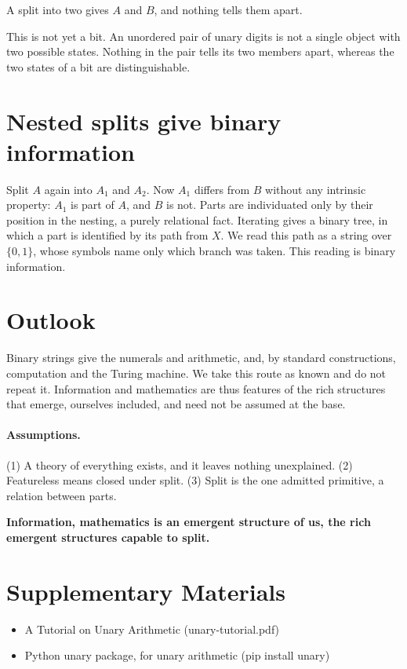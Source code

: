 \documentclass[11pt]{article}
\begin{document}
A split into two gives $A$ and $B$, and nothing tells them apart. 

This is not yet a bit. An unordered pair of unary digits is not a single object with two possible states. 
Nothing in the pair tells its two members apart, whereas the two states of a bit are distinguishable.


\section{Nested splits give binary information}
Split $A$ again into $A_1$ and $A_2$. Now $A_1$ differs from $B$ without any
intrinsic property: $A_1$ is part of $A$, and $B$ is not.
Parts are individuated only by their position in the nesting, a purely
relational fact. Iterating gives a binary tree, in which a part is identified by
its path from $X$. We read this path as a string over $\{0,1\}$, whose symbols
name only which branch was taken. This reading is binary information.

\section{Outlook}
Binary strings give the numerals and arithmetic, and, by standard
constructions, computation and the Turing machine. We take this route as known
and do not repeat it. Information and mathematics are thus features of the
rich structures that emerge, ourselves included, and need not be assumed at
the base.

\paragraph{Assumptions.}
(1) A theory of everything exists, and it leaves nothing unexplained.
(2) Featureless means closed under split.
(3) Split is the one admitted primitive, a relation between parts.

\medskip
\noindent\textbf{Information, mathematics is an emergent structure of us, the rich emergent structures capable to split.}


\section{Supplementary Materials}

\begin{itemize}
  \item A Tutorial on Unary Arithmetic (unary-tutorial.pdf)
  \item Python unary package, for unary arithmetic (pip install unary)
\end{itemize}
\end{document}
